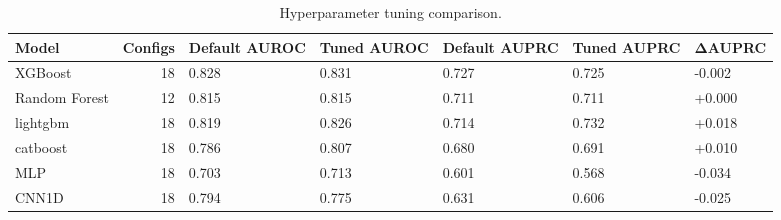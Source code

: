 \begin{table}
\caption{Hyperparameter tuning comparison.}
\label{tab:ext-tuning}
\begin{tabular}{lrlllll}
\toprule
Model & Configs & Default AUROC & Tuned AUROC & Default AUPRC & Tuned AUPRC & ΔAUPRC \\
\midrule
XGBoost & 18 & 0.828 & 0.831 & 0.727 & 0.725 & -0.002 \\
Random Forest & 12 & 0.815 & 0.815 & 0.711 & 0.711 & +0.000 \\
lightgbm & 18 & 0.819 & 0.826 & 0.714 & 0.732 & +0.018 \\
catboost & 18 & 0.786 & 0.807 & 0.680 & 0.691 & +0.010 \\
MLP & 18 & 0.703 & 0.713 & 0.601 & 0.568 & -0.034 \\
CNN1D & 18 & 0.794 & 0.775 & 0.631 & 0.606 & -0.025 \\
\bottomrule
\end{tabular}
\end{table}
